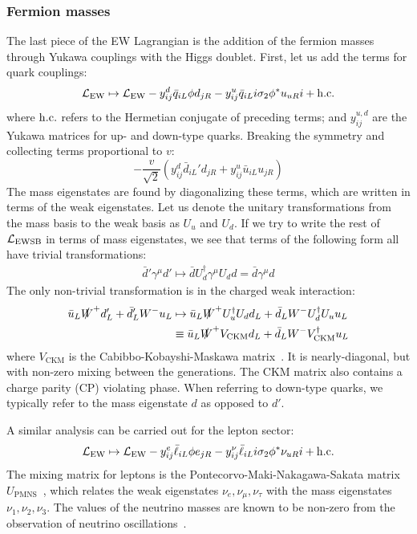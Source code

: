 \subsubsection{Fermion masses}
The last piece of the EW Lagrangian is the addition of the fermion masses through Yukawa couplings with the Higgs doublet. 
First, let us add the terms for quark couplings:
\begin{equation}
   \mathcal{L}_\mathrm{EW} \mapsto \mathcal{L}_\mathrm{EW} - y_{ij}^d \bar q_{iL} \phi d_{jR} - y_{ij}^u \bar q_{iL}i\sigma_2 \phi^* u_{uR}i + \mathrm{h.c.}
\end{equation}
where $\mathrm{h.c.}$ refers to the Hermetian conjugate of preceding terms; and $y_{ij}^{u,d}$ are the Yukawa matrices for up- and down-type quarks.
Breaking the symmetry and collecting terms proportional to $v$:
\begin{equation}
    -\frac{v}{\sqrt{2}}\left(y_{ij}^d \bar d_{iL}' d_{jR} + y_{ij}^u \bar u_{iL} u_{jR}\right) 
\end{equation}
The mass eigenstates are found by diagonalizing these terms, which are written in terms of the weak eigenstates.
Let us denote the unitary transformations from the mass basis to the weak basis as $U_u$ and $U_d$. 
If we try to write the rest of $\mathcal{L}_\mathrm{EWSB}$ in terms of mass eigenstates, we see that terms of the following form all have trivial transformations:
\begin{gather} 
\bar d' \gamma^\mu d' \mapsto \bar d U_d^\dag \gamma^\mu U_d d = \bar d \gamma^\mu d
\end{gather}
The only non-trivial transformation is in the charged weak interaction:
\begin{align} 
\bar u_L \slashed W^+ d'_L + \bar d'_L W^- u_L &\mapsto 
    \bar u_L \slashed W^+ U_u^\dag U_d d_L + \bar d_L W^- U_d^\dag U_u u_L \nonumber \\
    &\equiv \bar u_L \slashed W^+ V_\mathrm{CKM} d_L + \bar d_L W^- V^\dag_\mathrm{CKM} u_L
\end{align}
where $V_\mathrm{CKM}$ is the Cabibbo-Kobayshi-Maskawa matrix~\cite{ckm1,ckm2}.
It is nearly-diagonal, but with non-zero mixing between the generations. 
The CKM matrix also contains a charge parity (CP) violating phase.
When referring to down-type quarks, we typically refer to the mass eigenstate $d$ as opposed to $d'$.

A similar analysis can be carried out for the lepton sector:
\begin{equation}
   \mathcal{L}_\mathrm{EW} \mapsto \mathcal{L}_\mathrm{EW} - y_{ij}^e \bar \ell_{iL} \phi e_{jR} - y_{ij}^\nu \bar \ell_{iL}i\sigma_2 \phi^* \nu_{uR}i + \mathrm{h.c.}
\end{equation}
The mixing matrix for leptons is the Pontecorvo-Maki-Nakagawa-Sakata matrix $U_\mathrm{PMNS}$~\cite{pmns}, which relates the weak eigenstates $\nu_e, \nu_\mu,\nu_\tau$ with the mass eigenstates $\nu_1,\nu_2,\nu_3$.
The values of the neutrino masses are known to be non-zero from the observation of neutrino oscillations~\cite{nuosc}.

